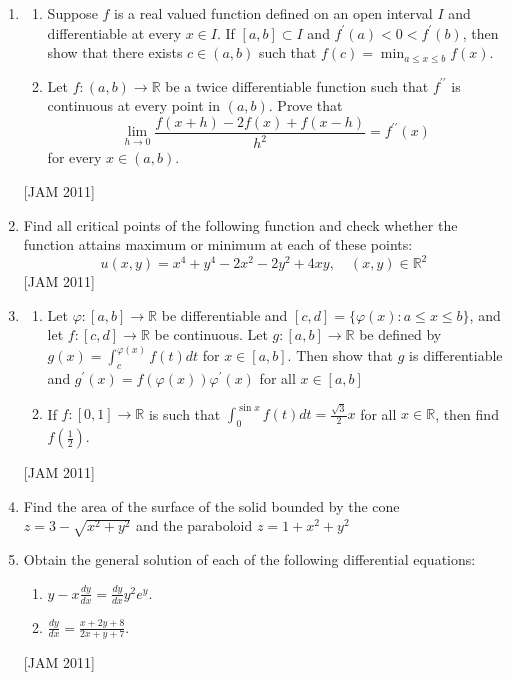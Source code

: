 \begin{enumerate}
\item 

\begin{enumerate}
    \item Suppose $f$ is a real valued function defined on an open interval $I$ and differentiable at every $x \in I$. If $[a, b] \subset I$ and $f^{\prime}(a)<0<f^{\prime}(b)$, then show that there exists $c \in(a, b)$ such that $f(c)=\min _{a \leq x \leq b} f(x)$.

\item  Let $f:(a, b) \rightarrow \mathbb{R}$ be a twice differentiable function such that $f^{\prime \prime}$ is continuous at every point in $(a, b)$. Prove that
$$
\lim _{h \rightarrow 0} \frac{f(x+h)-2 f(x)+f(x-h)}{h^{2}}=f^{\prime \prime}(x)
$$
for every $x \in(a, b)$.
\end{enumerate}
\hfill [JAM 2011]



\item  Find all critical points of the following function and check whether the function attains maximum or minimum at each of these points:
$$
u(x, y)=x^{4}+y^{4}-2 x^{2}-2 y^{2}+4 x y, \quad(x, y) \in \mathbb{R}^{2}
$$
\hfill [JAM 2011]

\item  
\begin{enumerate}
    \item  Let $\varphi:[a, b] \rightarrow \mathbb{R}$ be differentiable and $[c, d]=\{\varphi(x): a \leq x \leq b\}$, and let $f:[c, d] \rightarrow \mathbb{R}$ be continuous. Let $g:[a, b] \rightarrow \mathbb{R}$ be defined by $g(x)=\int_{c}^{\varphi(x)} f(t) d t$ for $x \in[a, b]$. Then show that $g$ is differentiable and $g^{\prime}(x)=f(\varphi(x)) \varphi^{\prime}(x)$ for all $x \in[a, b]$

\item If $f:[0,1] \rightarrow \mathbb{R}$ is such that $\int_{0}^{\sin x} f(t) d t=\frac{\sqrt{3}}{2} x$ for all $x \in \mathbb{R}$, then find $f\left(\frac{1}{2}\right)$.
\end{enumerate}
\hfill [JAM 2011]



\item  Find the area of the surface of the solid bounded by the cone $z=3-\sqrt{x^{2}+y^{2}}$ and the paraboloid $z=1+x^{2}+y^{2}$ \item  Obtain the general solution of each of the following differential equations: 

\begin{enumerate}
    \item $y-x \frac{d y}{d x}=\frac{d y}{d x} y^{2} e^{y}$. 
\item $\frac{d y}{d x}=\frac{x+2 y+8}{2 x+y+7}$.
\end{enumerate}
\hfill [JAM 2011]





\end{enumerate}
